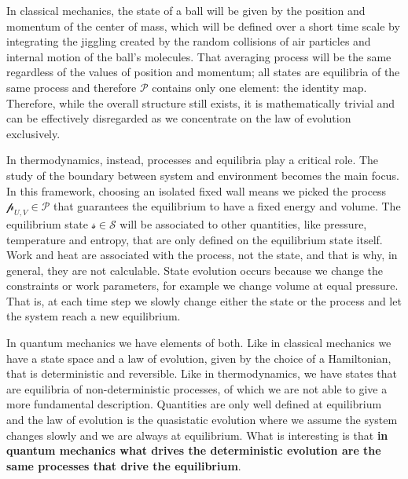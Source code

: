 \documentclass[applsci,article,submit,moreauthors,pdftex]{Definitions/mdpi}
\begin{document}
In classical mechanics, the state of a ball will be given by the position and momentum of the center of mass, which will be defined over a short time scale by integrating the jiggling created by the random collisions of air particles and internal motion of the ball's molecules. That averaging process will be the same regardless of the values of position and momentum; all states are equilibria of the same process and therefore $\mathcal{P}$ contains only one element: the identity map. Therefore, while the overall structure still exists, it is mathematically trivial and can be effectively disregarded as we concentrate on the law of evolution exclusively.

In thermodynamics, instead, processes and equilibria play a critical role. The study of the boundary between system and environment becomes the main focus. In this framework, choosing an isolated fixed wall means we picked the process $\mathcal{p}_{U,V} \in \mathcal{P}$ that guarantees the equilibrium to have a fixed energy and volume. The equilibrium state $\mathcal{s} \in \mathcal{S}$ will be associated to other quantities, like pressure, temperature and entropy, that are only defined on the equilibrium state itself. Work and heat are associated with the process, not the state, and that is why, in general, they are not calculable. State evolution occurs because we change the constraints or work parameters, for example we change volume at equal pressure. That is, at each time step we slowly change either the state or the process and let the system reach a new equilibrium.

In quantum mechanics we have elements of both. Like in classical mechanics we have a state space and a law of evolution, given by the choice of a Hamiltonian, that is deterministic and reversible. Like in thermodynamics, we have states that are equilibria of non-deterministic processes, of which we are not able to give a more fundamental description. Quantities are only well defined at equilibrium and the law of evolution is the quasistatic evolution where we assume the system changes slowly and we are always at equilibrium. What is interesting is that \textbf{in quantum mechanics what drives the deterministic evolution are the same processes that drive the equilibrium}.
\end{document}
